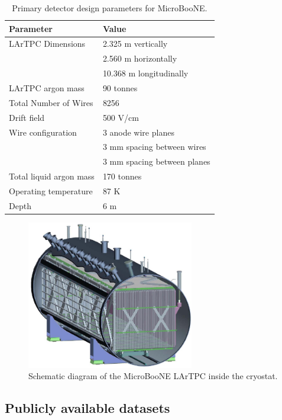 \documentclass{pracalicmgr}
\begin{document}
\begin{table}[H]
\centering
\caption{Primary detector design parameters for MicroBooNE.\cite{MicroBooNEDesign}}
\begin{tabular}{|l|l|}
\hline
\textbf{Parameter} & \textbf{Value} \\
\hline
LArTPC Dimensions & 2.325 m vertically \\
                  & 2.560 m horizontally \\
                  & 10.368 m longitudinally \\
\hline
LArTPC argon mass & 90 tonnes \\
\hline
Total Number of Wires & 8256 \\
\hline
Drift field & 500 V/cm \\
\hline
Wire configuration & 3 anode wire planes \\
                   & 3 mm spacing between wires \\
                   & 3 mm spacing between planes \\
\hline
Total liquid argon mass & 170 tonnes \\
\hline
Operating temperature & 87 K \\
\hline
Depth & 6 m \\
\hline
\end{tabular}
\label{tab:microboone_specs}
\end{table}


\begin{figure}[H]
    \centering
    \includegraphics[width=0.65\textwidth]{src/microBooNe_Layout.pdf}
    \caption{Schematic diagram of the MicroBooNE LArTPC inside the cryostat.\cite{MicroBooNEDesign}}
    \label{fig:microboone_layout}
\end{figure}

\subsection{Publicly available datasets}
\end{document}
